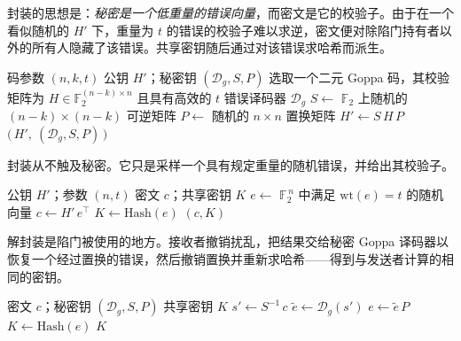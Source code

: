 封装的思想是：\emph{秘密是一个低重量的错误向量}，而密文是它的校验子。由于在一个看似随机的 $H'$ 下，重量为 $t$ 的错误的校验子难以求逆，密文便对除陷门持有者以外的所有人隐藏了该错误。共享密钥随后通过对该错误求哈希而派生。

\begin{algorithm}[H]
\caption{Classic McEliece KeyGen（教学形式）}
\label{alg:mce-keygen}
\begin{algorithmic}[1]
\Require 码参数 $(n,k,t)$
\Ensure 公钥 $H'$；秘密钥 $(\mathcal{D}_g, S, P)$
\State 选取一个二元 Goppa 码，其校验矩阵为 $H \in \mathbb{F}_2^{(n-k)\times n}$
\Statex \hspace{1.4em}且具有高效的 $t$ 错误译码器 $\mathcal{D}_g$ 
\State $S \gets$ $\mathbb{F}_2$ 上随机的 $(n-k)\times(n-k)$ 可逆矩阵 
\State $P \gets$ 随机的 $n\times n$ 置换矩阵 
\State $H' \gets S\,H\,P$ 
\State \Return $\big(\,H',\ (\mathcal{D}_g, S, P)\,\big)$
\end{algorithmic}
\end{algorithm}

封装从不触及秘密。它只是采样一个具有规定重量的随机错误，并给出其校验子。

\begin{algorithm}[H]
\caption{Classic McEliece Encapsulate（教学形式）}
\label{alg:mce-encap}
\begin{algorithmic}[1]
\Require 公钥 $H'$；参数 $(n,t)$
\Ensure 密文 $c$；共享密钥 $K$
\State $e \gets$ $\mathbb{F}_2^{\,n}$ 中满足 $\mathrm{wt}(e) = t$ 的随机向量 
\State $c \gets H'\,e^\top$ 
\State $K \gets \mathrm{Hash}(e)$ 
\State \Return $(c, K)$
\end{algorithmic}
\end{algorithm}

解封装是陷门被使用的地方。接收者撤销扰乱，把结果交给秘密 Goppa 译码器以恢复一个经过置换的错误，然后撤销置换并重新求哈希——得到与发送者计算的相同的密钥。

\begin{algorithm}[H]
\caption{Classic McEliece Decapsulate（教学形式）}
\label{alg:mce-decap}
\begin{algorithmic}[1]
\Require 密文 $c$；秘密钥 $(\mathcal{D}_g, S, P)$
\Ensure 共享密钥 $K$
\State $s' \gets S^{-1}\,c$ 
\State $\tilde e \gets \mathcal{D}_g(s')$ 
\State $e \gets \tilde e\,P$ 
\State $K \gets \mathrm{Hash}(e)$ 
\State \Return $K$
\end{algorithmic}
\end{algorithm}

